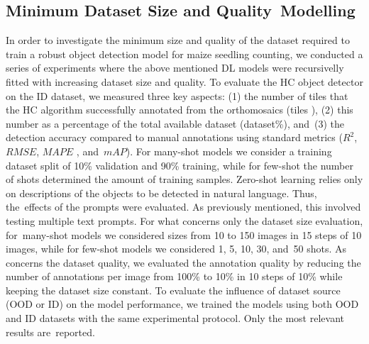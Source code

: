 \documentclass[12pt,a4paper,oneside]{report}
\begin{document}
\subsection{Minimum Dataset Size and Quality~Modelling}
In order to investigate the minimum size and quality of the dataset required to train 
a robust object detection model for maize seedling counting, we conducted a series of experiments
where the above mentioned DL models were recursivelly fitted with increasing dataset size and quality.
To evaluate the HC object detector on the ID dataset,
we measured three key aspects: (1) the number of tiles that the HC algorithm 
successfully annotated from the orthomosaics (tiles%
), (2) this number as a percentage 
of the total available dataset (dataset\%), and~(3) the detection accuracy compared to 
manual annotations using standard metrics ($R^2$, $RMSE$, $MAPE$%
, and~$mAP$).
For many-shot models we consider a training 
dataset split of 10\% validation and 90\% training, while for few-shot the number of shots
determined the amount of training samples. Zero-shot learning relies only on descriptions of the objects to be detected in natural language. Thus, the~effects of the prompts were evaluated.
As previously mentioned, this involved testing multiple text prompts.
For what concerns only the dataset size evaluation, for~many-shot models we considered
sizes from 10 to 150 images in 15 steps of 10 images, while for few-shot models we considered
1, 5, 10, 30, and~50 shots.
As concerns the dataset quality, we evaluated the annotation quality by reducing
the number of annotations per image from 100\% to 10\% in 10 steps of 10\% while
keeping the dataset size constant.
To evaluate the influence of dataset source (OOD or ID) on the model performance, we trained
the models using both OOD and ID datasets with the same experimental protocol.
Only the most relevant results are~reported.
\end{document}
